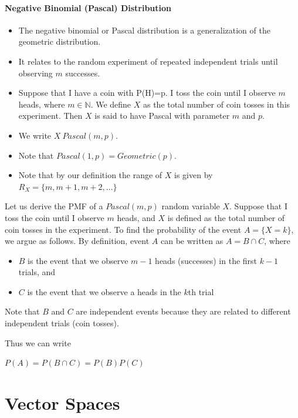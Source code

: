\documentclass{report}
\begin{document}
\subsubsection{Negative Binomial (Pascal) Distribution}
\begin{itemize}
	\item The negative binomial or Pascal distribution is a generalization of the geometric distribution.
    \item It relates to the random experiment of repeated independent trials until observing $m$ successes.
    \item Suppose that I have a coin with P(H)=p. I toss the coin until I observe $m$ heads, where $m \in \mathbb{N}$. We define $X$ as the total number of coin tosses in this experiment. Then $X$ is said to have Pascal with parameter $m$ and $p$.
    \item We write $X~Pascal(m,p)$.
    \item Note that $Pascal(1,p)=Geometric(p)$.
    \item Note that by our definition the range of $X$ is given by $R_X=\{m,m+1,m+2,...\}$
\end{itemize}

\noindent Let us derive the PMF of a $Pascal(m,p)$ random variable $X$. Suppose that I toss the coin until I observe $m$ heads, and $X$ is defined as the total number of coin tosses in the experiment. To find the probability of the event $A=\{X=k\}$, we argue as follows. By definition, event $A$ can be written as $A=B \cap C$, where
\begin{itemize}
	\item $B$ is the event that we observe $m-1$ heads (successes) in the first $k-1$ trials, and
    \item $C$ is the event that we observe a heads in the $k$th trial
\end{itemize}

\noindent Note that $B$ and $C$ are independent events because they are related to different independent trials (coin tosses).\medskip

\noindent Thus we can write\newline\medskip
\centerline{$P(A) = P(B \cap C) = P(B)P(C)$}




\chapter{Vector Spaces}

\end{document}
